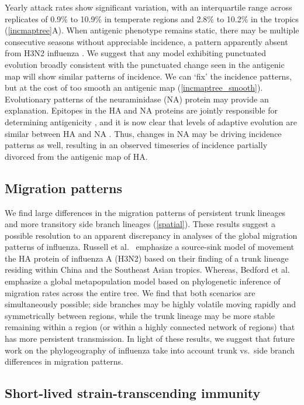 Yearly attack rates show significant variation, with an interquartile range across replicates of 0.9\% to 10.9\% in temperate regions and 2.8\% to 10.2\% in the tropics (\ref{incmaptree}A).  When antigenic phenotype remains static, there may be multiple consecutive seasons without appreciable incidence, a pattern apparently absent from H3N2 influenza .  We suggest that any model exhibiting punctuated evolution broadly consistent with the punctuated change seen in the antigenic map will show similar patterns of incidence.  We can `fix' the incidence patterns, but at the cost of too smooth an antigenic map (\ref{incmaptree_smooth}).  Evolutionary patterns of the neuraminidase (NA) protein may provide an explanation.  Epitopes in the HA and NA proteins are jointly responsible for determining antigenicity \cite{Nelson07NatRevGenet}, and it is now clear that levels of adaptive evolution are similar between HA and NA .  Thus, changes in NA may be driving incidence patterns as well, resulting in an observed timeseries of incidence partially divorced from the antigenic map of HA.

\subsection*{Migration patterns}

We find large differences in the migration patterns of persistent trunk lineages and more transitory side branch lineages (\ref{spatial}).  These results suggest a possible resolution to an apparent discrepancy in analyses of the global migration patterns of influenza.  Russell et al.\ \cite{Russell08} emphasize a source-sink model of movement the HA protein of influenza A (H3N2) based on their finding of a trunk lineage residing within China and the Southeast Asian tropics.  Whereas, Bedford et al.\ \cite{Bedford10} emphasize a global metapopulation model based on phylogenetic inference of migration rates across the entire tree.  We find that both scenarios are simultaneously possible; side branches may be highly volatile moving rapidly and symmetrically between regions, while the trunk lineage may be more stable remaining within a region (or within a highly connected network of regions) that has more persistent transmission.  In light of these results, we suggest that future work on the phylogeography of influenza take into account trunk vs.\ side branch differences in migration patterns.

\subsection*{Short-lived strain-transcending immunity}

